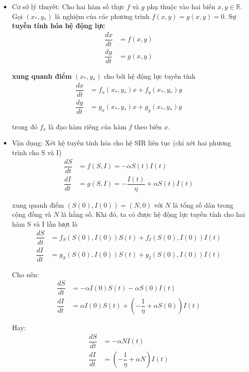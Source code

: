 \documentclass[a4paper]{article}
\begin{document}
\begin{itemize}

    \item Cơ sở lý thuyết: Cho hai hàm số thực $f$ và $g$ phụ thuộc vào hai biến $x, y \in \mathbb{R}$. Gọi $(x_*,y_*)$ là nghiệm của các phương trình $f(x,y)=g(x,y)=0$. Sự \textbf{tuyến tính hóa hệ động lực}
    \begin{align*}
        \dfrac{dx}{dt} &= f(x,y) \\
        \dfrac{dy}{dt} &= g(x,y)
    \end{align*}

    \textbf{xung quanh điểm} $(x_*,y_*)$ cho bởi hệ động lực tuyến tính
    \begin{align*}
        \dfrac{dx}{dt} &= f_x(x_*,y_*)x + f_y(x_*,y_*)y \\
        \dfrac{dy}{dt} &= g_x(x_*,y_*)x + g_y(x_*,y_*)y
    \end{align*}

    trong đó $f_x$ là đạo hàm riêng của hàm $f$ theo biến $x$.

    \item Vận dụng: Xét hệ tuyến tính hóa cho hệ SIR liên tục (chỉ xét hai phương trình cho S và I)
    \begin{align*}
        \dfrac{dS}{dt} &= f(S,I) = -\alpha S(t)I(t)\\
        \dfrac{dI}{dt} &= g(S,I) = - \dfrac{I(t)}{\eta} +  \alpha S(t)I(t)
    \end{align*}

    xung quanh điểm $(S(0),I(0)) = (N,0)$ với $N$ là tổng số dân trong cộng đồng và $N$ là hằng số. Khi đó, ta có được hệ động lực tuyến tính cho hai hàm S và I lần lượt là
    \begin{align*}
            \dfrac{dS}{dt} &= f_S(S(0),I(0))S(t) + f_I(S(0),I(0))I(t) \\
            \dfrac{dI}{dt} &= g_S(S(0),I(0))S(t) + g_I(S(0),I(0))I(t)
    \end{align*}
    
    Cho nên:
    \begin{align*}
            \dfrac{dS}{dt} &= -\alpha I(0)S(t) -\alpha S(0)I(t) \\
            \dfrac{dI}{dt} &= \alpha I(0)S(t) + (- \dfrac{1}{\eta} +  \alpha S(0))I(t)
    \end{align*}
    
    Hay:
    \begin{align}
            \dfrac{dS}{dt} &= -\alpha NI(t) \\
            \dfrac{dI}{dt} &= (- \dfrac{1}{\eta} +  \alpha N)I(t)
    \end{align}
    

\end{itemize}
\end{document}
